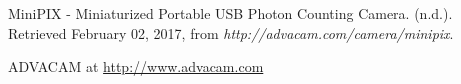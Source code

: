 \documentclass[final,1p, times, twocolumn]{elsarticle}
\begin{document}
\begin{thebibliography}{00}



MiniPIX - Miniaturized Portable USB Photon Counting Camera. (n.d.). Retrieved February 02, 2017, from \textit{http://advacam.com/camera/minipix}.

%
%
%
%
%	
%
%
%
  ADVACAM at \url{http://www.advacam.com}
%
%  
%
%

\end{thebibliography}
\end{document}
